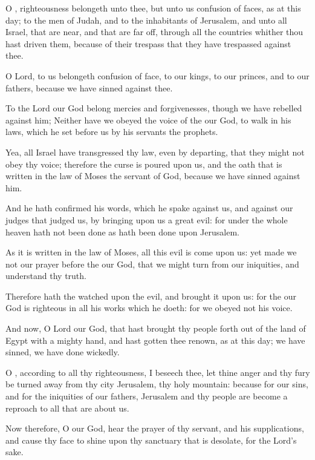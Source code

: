 \Verse O \LORD, righteousness belongeth unto thee, but unto us confusion of faces, as at this day; to the men of Judah, and to the inhabitants of Jerusalem, and unto all Israel, that are near, and that are far off, through all the countries whither thou hast driven them, because of their trespass that they have trespassed against thee.

\Verse O Lord, to us belongeth confusion of face, to our kings, to our princes, and to our fathers, because we have sinned against thee.

\Verse To the Lord our God belong mercies and forgivenesses, though we have rebelled against him; \Verse Neither have we obeyed the voice of the \LORD our God, to walk in his laws, which he set before us by his servants the prophets.

\Verse Yea, all Israel have transgressed thy law, even by departing, that they might not obey thy voice; therefore the curse is poured upon us, and the oath that is written in the law of Moses the servant of God, because we have sinned against him.

\Verse And he hath confirmed his words, which he spake against us, and against our judges that judged us, by bringing upon us a great evil: for under the whole heaven hath not been done as hath been done upon Jerusalem.

\Verse As it is written in the law of Moses, all this evil is come upon us: yet made we not our prayer before the \LORD our God, that we might turn from our iniquities, and understand thy truth.

\Verse Therefore hath the \LORD watched upon the evil, and brought it upon us: for the \LORD our God is righteous in all his works which he doeth: for we obeyed not his voice.

\Verse And now, O Lord our God, that hast brought thy people forth out of the land of Egypt with a mighty hand, and hast gotten thee renown, as at this day; we have sinned, we have done wickedly.

\Verse O \LORD, according to all thy righteousness, I beseech thee, let thine anger and thy fury be turned away from thy city Jerusalem, thy holy mountain: because for our sins, and for the iniquities of our fathers, Jerusalem and thy people are become a reproach to all that are about us.

\Verse Now therefore, O our God, hear the prayer of thy servant, and his supplications, and cause thy face to shine upon thy sanctuary that is desolate, for the Lord's sake.

